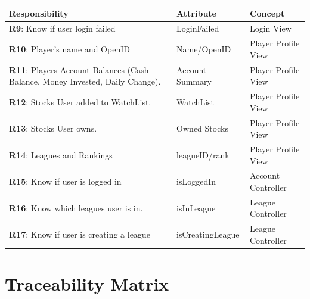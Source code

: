 \begin{centering}
\renewcommand\arraystretch{1.3}
\label{UC-3}
\begin{longtable}{|p{4in}| p{1in}| p{1.5in} |}
\hline
\bfseries{\color{color1}Responsibility} &
          \bfseries{\color{color1}Attribute} &
          \bfseries{\color{color1}Concept} \\ \hline

          \textbf{R9}: Know if user login failed
          & LoginFailed
          & Login View \\ \hline


          \textbf{R10}: Player's name and OpenID
          & Name/OpenID
          & Player Profile View \\ \hline

          \textbf{R11}: Players Account Balances (Cash Balance,
          Money Invested, Daily Change).
          & Account Summary
          & Player Profile View \\ \hline

          \textbf{R12}: Stocks User added to WatchList.
          & WatchList
          & Player Profile View \\ \hline

          \textbf{R13}: Stocks User owns.
          & Owned Stocks
          & Player Profile View \\ \hline

          \textbf{R14}: Leagues and Rankings
          & leagueID/rank
          & Player Profile View \\ \hline

          \textbf{R15}: Know if user is logged in
          & isLoggedIn
          & Account Controller \\ \hline

          \textbf{R16}: Know which leagues user is in.
          & isInLeague
          & League Controller \\ \hline

          \textbf{R17}: Know if user is creating a league
          & isCreatingLeague
          & League Controller \\ \hline


\end{longtable}
\end{centering}

\newpage

\section{Traceability Matrix}

